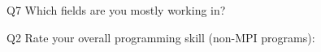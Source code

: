 \begin{description}%
\item{Q7} Which fields are you mostly working in?%
\item{Q2} Rate your overall programming skill (non-MPI programs):%
\end{description}%
